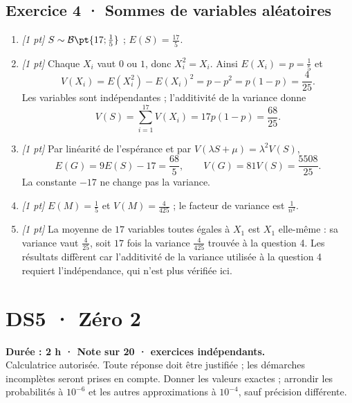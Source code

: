 \subsection*{Exercice 4 · Sommes de variables aléatoires}\begin{enumerate}

\item \textit{[1 pt]} $S\sim\mathcal B\pt{17;\frac{1}{5}}$ ; $E(S)=\frac{17}{5}$.

\item \textit{[1 pt]} Chaque $X_i$ vaut $0$ ou $1$, donc $X_i^2=X_i$. Ainsi $E(X_i)=p=\frac{1}{5}$ et
\[V(X_i)=E(X_i^2)-E(X_i)^2=p-p^2=p(1-p)=\frac{4}{25}.\]
Les variables sont indépendantes ; l'additivité de la variance donne
\[V(S)=\sum_{i=1}^{17}V(X_i)=17p(1-p)=\frac{68}{25}.\]

\item \textit{[1 pt]} Par linéarité de l'espérance et par $V(\lambda S+\mu)=\lambda^2V(S)$,
\[E(G)=9E(S)-17=\frac{68}{5},\qquad V(G)=81V(S)=\frac{5508}{25}.\]
La constante $-17$ ne change pas la variance.

\item \textit{[1 pt]} $E(M)=\frac{1}{5}$ et $V(M)=\frac{4}{425}$ ; le facteur de variance est $\frac{1}{n^2}$.

\item \textit{[1 pt]} La moyenne de $17$ variables toutes égales à $X_1$ est $X_1$ elle-même : sa variance vaut $\frac{4}{25}$, soit $17$ fois la variance $\frac{4}{425}$ trouvée à la question 4. Les résultats diffèrent car l'additivité de la variance utilisée à la question 4 requiert l'indépendance, qui n'est plus vérifiée ici.

\end{enumerate}

\fi

\mxnewpage{}\label{sujet:7-2}

\section*{DS5 · Zéro 2}


\textbf{Durée : 2 h · Note sur 20 ·  exercices indépendants.}\\Calculatrice autorisée. Toute réponse doit être justifiée ; les démarches incomplètes seront prises en compte. Donner les valeurs exactes ; arrondir les probabilités à $10^{-6}$ et les autres approximations à $10^{-4}$, sauf précision différente.


